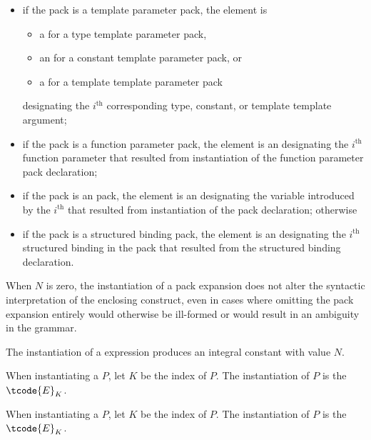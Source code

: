 \begin{itemize}
\item
if the pack is a template parameter pack, the element is
\begin{itemize}
\item
a  for a type template parameter pack,
\item
an  for a constant template parameter pack, or
\item
a  for a template template parameter pack
\end{itemize}
designating the $i^\text{th}$ corresponding
type, constant, or template template argument;

\item
if the pack is a function parameter pack, the element is an
designating the $i^\text{th}$ function parameter
that resulted from instantiation of
the function parameter pack declaration;

\item
if the pack is an  pack,
the element is an 
designating the variable introduced by
the $i^\text{th}$ 
that resulted from instantiation of
the  pack declaration;
otherwise

\item
if the pack is a structured binding pack,
the element is an 
designating the $i^\textrm{th}$ structured binding in the pack
that resulted from the structured binding declaration.
\end{itemize}
When $N$ is zero, the instantiation of a pack expansion
does not alter the syntactic interpretation of the enclosing construct,
even in cases where omitting the pack expansion entirely would
otherwise be ill-formed or would result in an ambiguity in the grammar.

\pnum
The instantiation of a  expression produces
an integral constant with value $N$.

\pnum
When instantiating a  $P$,
let $K$ be the index of $P$.
The instantiation of $P$ is the  $\tcode{E}_K$.

\pnum
When instantiating a  $P$,
let $K$ be the index of $P$.
The instantiation of $P$ is the  $\tcode{E}_K$.

